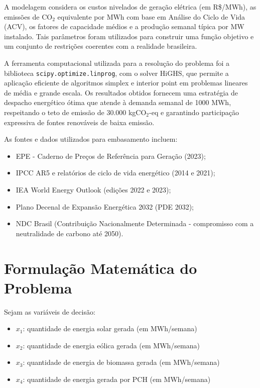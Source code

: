 \documentclass[12pt]{article}
\begin{document}
A modelagem considera os custos nivelados de geração elétrica (em R\$/MWh), as emissões de CO$_2$ equivalente por MWh com base em Análise do Ciclo de Vida (ACV), os fatores de capacidade médios e a produção semanal típica por MW instalado. Tais parâmetros foram utilizados para construir uma função objetivo e um conjunto de restrições coerentes com a realidade brasileira.

A ferramenta computacional utilizada para a resolução do problema foi a biblioteca \texttt{scipy.optimize.linprog}, com o solver HiGHS, que permite a aplicação eficiente de algoritmos simplex e interior point em problemas lineares de média e grande escala. Os resultados obtidos fornecem uma estratégia de despacho energético ótima que atende à demanda semanal de 1000 MWh, respeitando o teto de emissão de 30.000 kgCO$_2$-eq e garantindo participação expressiva de fontes renováveis de baixa emissão.

As fontes e dados utilizados para embasamento incluem:

\begin{itemize}
    \item EPE - Caderno de Preços de Referência para Geração (2023);
    \item IPCC AR5 e relatórios de ciclo de vida energético (2014 e 2021);
    \item IEA World Energy Outlook (edições 2022 e 2023);
    \item Plano Decenal de Expansão Energética 2032 (PDE 2032);
    \item NDC Brasil (Contribuição Nacionalmente Determinada - compromisso com a neutralidade de carbono até 2050).
\end{itemize}

\section*{Formulação Matemática do Problema}

Sejam as variáveis de decisão:

\begin{itemize}
  \item $x_1$: quantidade de energia solar gerada (em MWh/semana)
  \item $x_2$: quantidade de energia eólica gerada (em MWh/semana)
  \item $x_3$: quantidade de energia de biomassa gerada (em MWh/semana)
  \item $x_4$: quantidade de energia gerada por PCH (em MWh/semana)
\end{itemize}
\end{document}
